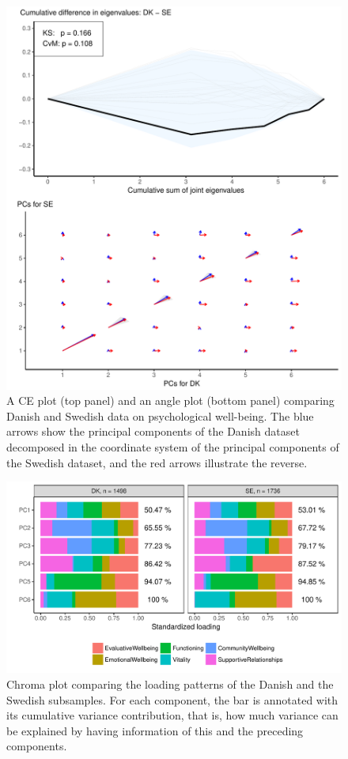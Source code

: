 \documentclass[a4paper,12pt]{article}
\begin{document}
\begin{figure}[H]
\center
\includegraphics[scale=0.8]{Figure8_v3.pdf}
\caption{A CE plot (top panel) and an angle plot (bottom panel) comparing Danish and Swedish data on psychological well-being. The blue arrows show the principal components of the Danish dataset decomposed in the coordinate system of the principal components of the Swedish dataset, and the red arrows illustrate the reverse.}
\label{plotSE.cehair}
\end{figure}

\begin{figure}[H]
\center
\includegraphics[scale=0.8]{Figure9_v3.pdf}
\caption{Chroma plot comparing the loading patterns of the Danish and the Swedish subsamples. For each component, the bar is annotated with its cumulative variance contribution, that is, how much variance can be explained by having information of this and the preceding components.}
\label{plotSE.pancake}
\end{figure}
\end{document}
